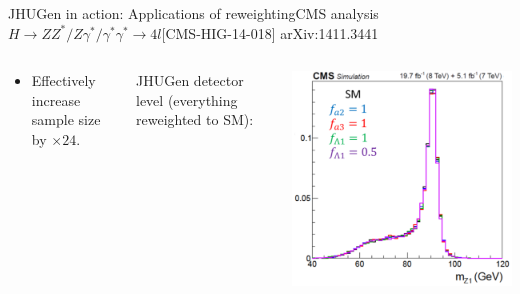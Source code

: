 \documentclass[usenames,dvipsnames,svgnames,table]{beamer}
\begin{document}
\begin{frame}{JHUGen in action: Applications of reweighting}{CMS analysis $H \to ZZ^*/Z\gamma^*/\gamma^*\gamma^* \to 4l$\hfill [CMS-HIG-14-018] arXiv:1411.3441}
\begin{columns}
\begin{column}{0.6\textwidth}
\begin{itemize}
\item Effectively increase sample size by $\times 24$.
\end{itemize}
\end{column}
\begin{column}{0.13\textwidth} \footnotesize
JHUGen detector level (everything reweighted to SM):
\end{column}
\begin{column}{0.27\textwidth}
\includegraphics[width=\textwidth]{reweighting/HVV/reweighted}
\end{column}
\end{columns}
\end{frame}
\end{document}
